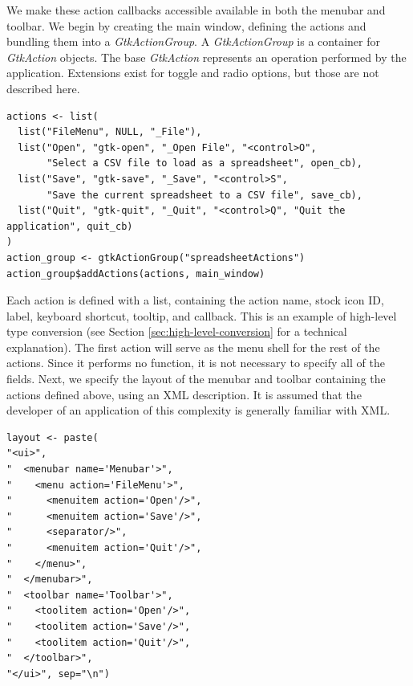 \documentclass[article]{jss}
\begin{document}
We make these action callbacks accessible available in both the
menubar and toolbar. We begin by creating the main window, defining
the actions and bundling them into a \emph{GtkActionGroup}.  A
\emph{GtkActionGroup} is a container for \emph{GtkAction} objects. 
The base \emph{GtkAction} represents an operation performed by the
application. Extensions exist for toggle and radio options, but those
are not described here.
\begin{verbatim}
actions <- list(
  list("FileMenu", NULL, "_File"), 
  list("Open", "gtk-open", "_Open File", "<control>O", 
       "Select a CSV file to load as a spreadsheet", open_cb),
  list("Save", "gtk-save", "_Save", "<control>S", 
       "Save the current spreadsheet to a CSV file", save_cb),
  list("Quit", "gtk-quit", "_Quit", "<control>Q", "Quit the application", quit_cb)
)
action_group <- gtkActionGroup("spreadsheetActions")
action_group$addActions(actions, main_window)
\end{verbatim}
Each action is defined with a list, containing the action name,
stock icon ID,
label, keyboard shortcut, tooltip, and callback.
This is an example of 
high-level type conversion (see Section \ref{sec:high-level-conversion} for
a technical explanation). The first action will serve as 
the menu shell
for the rest of the actions. Since it performs no
function, it is not necessary to specify all of the fields. Next, we specify
the layout of the menubar and toolbar containing the actions defined above, using
an XML description. It is assumed that the developer of an application of
this complexity is generally familiar with XML.
\begin{verbatim}
layout <- paste(
"<ui>",
"  <menubar name='Menubar'>",
"    <menu action='FileMenu'>",
"      <menuitem action='Open'/>",
"      <menuitem action='Save'/>",
"      <separator/>",
"      <menuitem action='Quit'/>",
"    </menu>",
"  </menubar>",
"  <toolbar name='Toolbar'>",
"    <toolitem action='Open'/>",
"    <toolitem action='Save'/>",
"    <toolitem action='Quit'/>",
"  </toolbar>",
"</ui>", sep="\n")
\end{verbatim}
\end{document}
